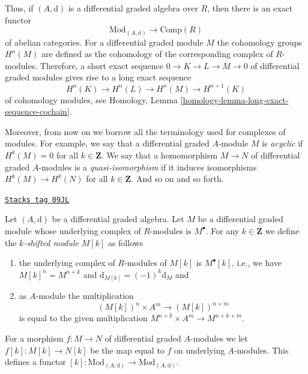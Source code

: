 Thus, if $(A, \text{d})$ is a differential graded
algebra over $R$, then there is an exact functor
$$
\text{Mod}_{(A, \text{d})} \longrightarrow \text{Comp}(R)
$$
of abelian categories. For a differential graded module $M$ the
cohomology groups $H^n(M)$ are defined as the cohomology of the
corresponding complex of $R$-modules. Therefore, a short exact
sequence $0 \to K \to L \to M \to 0$ of differential graded modules
gives rise to a long exact sequence
\begin{equation}
\label{equation-les}
H^n(K) \to H^n(L) \to H^n(M) \to H^{n + 1}(K)
\end{equation}
of cohomology modules, see
Homology, Lemma \ref{homology-lemma-long-exact-sequence-cochain}.

\medskip\noindent
Moreover, from now on we borrow all the terminology used for
complexes of modules. For example, we say that a differential
graded $A$-module $M$ is {\it acyclic} if $H^k(M) = 0$ for
all $k \in \mathbf{Z}$. We say that a homomorphism $M \to N$
of differential graded $A$-modules is a {\it quasi-isomorphism}
if it induces isomorphisms $H^k(M) \to H^k(N)$ for all $k \in \mathbf{Z}$.
And so on and so forth.

\begin{definition}[Shift]
\label{dga-definition-shift}
\href{https://stacks.math.columbia.edu/tag/09JL}{\texttt{Stacks tag 09JL}}

Let $(A, \text{d})$ be a differential graded algebra.
Let $M$ be a differential graded module whose underlying complex
of $R$-modules is $M^\bullet$. For any $k \in \mathbf{Z}$
we define the {\it $k$-shifted module} $M[k]$ as follows
\begin{enumerate}
\item the underlying complex of $R$-modules of $M[k]$ is $M^\bullet[k]$,
i.e., we have $M[k]^n = M^{n + k}$ and
$\text{d}_{M[k]} = (-1)^k\text{d}_M$ and
\item as $A$-module the multiplication
$$
(M[k])^n \times A^m \longrightarrow (M[k])^{n + m}
$$
is equal to the given multiplication $M^{n + k} \times A^m \to M^{n + k + m}$.
\end{enumerate}
For a morphism $f : M \to N$ of differential graded $A$-modules
we let $f[k] : M[k] \to N[k]$ be the map equal to $f$ on underlying
$A$-modules. This defines a functor
$[k] : \text{Mod}_{(A, \text{d})} \to \text{Mod}_{(A, \text{d})}$.
\end{definition}

